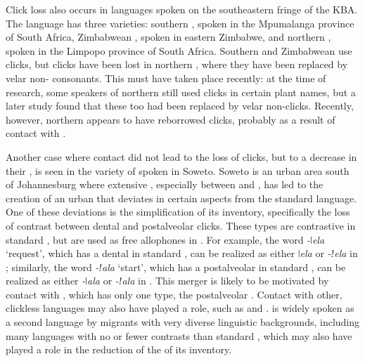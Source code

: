 \documentclass[output=paper
,newtxmath
,modfonts
,nonflat]{langsci/langscibook}
\begin{document}
Click loss also occurs in   languages spoken on the southeastern fringe of the KBA. The  language  has three varieties: southern , spoken in the Mpumalanga province of South Africa, Zimbabwean , spoken in eastern Zimbabwe, and northern , spoken in the Limpopo province of South Africa. Southern and Zimbabwean  use clicks, but clicks have been lost in northern , where they have been replaced by velar non- consonants. This  must have taken place recently: at the time of  research, some speakers of northern  still used clicks in certain plant names, but a later study \citep{Skhosana2009} found that these too had been replaced by velar non-clicks. Recently, however, northern  appears to have reborrowed clicks, probably as a result of contact with  \citep{schulzlaine2016}. 

Another case where contact did not lead to the loss of clicks, but to a decrease in their , is seen in the variety of  spoken in Soweto. Soweto is an urban area south of Johannesburg where extensive , especially between  and , has led to the creation of an urban  that deviates in certain aspects from the standard language. One of these deviations is the simplification of its  inventory, specifically the loss of contrast between dental and postalveolar clicks. These  types are contrastive in standard , but are used as free allophones in . For example, the word \textit{-ǀela} ‘request’, which has a dental  in standard , can be realized as either \textit{\-ǀela} or \textit{-ǃela} in ; similarly, the word \textit{-ǃala} ‘start’, which has a postalveolar  in standard , can be realized as either \textit{-ǀala} or \textit{-ǃala} in  \citep[164-165]{Gunnink2014}. This merger is likely to be motivated by contact with , which has only one  type, the postalveolar . Contact with other, clickless  languages may also have played a role, such as  and .  is widely spoken as a second language by migrants with very diverse linguistic backgrounds, including many languages with no or fewer  contrasts than standard , which may also have played a role in the reduction of the  of its  inventory.
\end{document}
